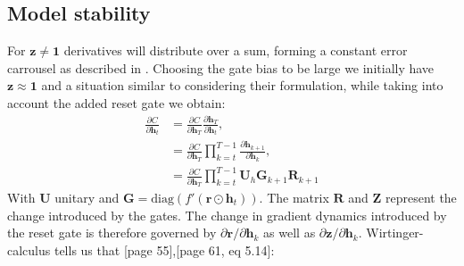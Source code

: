 \documentclass{article}
\begin{document}
\subsection{Model stability}
For $\mathbf{z} \neq \mathbf{1}$ derivatives will distribute over a sum, forming a constant error carrousel as described in \cite{Hochreiter}. Choosing the gate bias to be large we initially have $\mathbf{z} \approx \mathbf{1}$ and a situation similar to \cite{Arjovsky} considering their formulation, while taking into account the added reset gate we obtain: 
\begin{align}
\frac{\partial C}{\partial \mathbf{h}_{t}} &= \frac{\partial C}{\partial \mathbf{h}_T}\frac{\partial 
                                              \mathbf{h}_T}{\partial \mathbf{h}_t}, 
                                     \label{eq:peep_cost} \\
                                  &= \frac{\partial C}{\partial \mathbf{h}_T}\prod_{k=t}^{T-1}\frac{\partial \mathbf{h}_{k+1}}{\partial \mathbf{h}_k}, \\
                                  &= \frac{\partial C}{\partial \mathbf{h}_T}\prod_{k=t}^{T-1}\mathbf{U}_h
                                  \mathbf{G}_{k+1} \mathbf{R}_{k+1}
\end{align}
With $\mathbf{U}$ unitary and $\mathbf{G} = \text{diag} (f'(\mathbf{r} \odot \mathbf{h}_t))$. The matrix $\mathbf{R}$ and $\mathbf{Z}$ represent the change introduced by the gates. The change in gradient dynamics introduced by the reset gate is therefore governed by $\partial \mathbf{r}/ \partial \mathbf{h}_k$ as well as $\partial \mathbf{z}/ \partial \mathbf{h}_k$. 
Wirtinger-calculus tells us that \cite{Remmert}[page 55],\cite{Mandic}[page 61, eq 5.14]:
\end{document}
